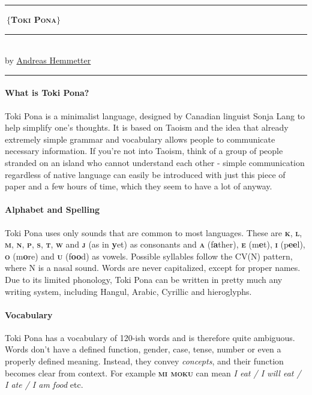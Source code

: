 \documentclass[10pt,a4paper]{article}
\author{Andreas Hemmetter}
\begin{document}
\pagestyle{empty}
\begin{center}
\rule{40mm}{2pt}$~\big\{$\textbf{\textsc{{\large  Toki Pona}}}$\big\}~$\rule{40mm}{2pt}\\
by \href{mailto:a.hemmetter@gmail.com}{Andreas Hemmetter}
\rule{15cm}{0.2pt}
\end{center}

\paragraph{What is Toki Pona?}
Toki Pona is a minimalist language, designed by Canadian linguist Sonja Lang to help simplify one's thoughts. It is based on Taoism and the idea that already extremely simple grammar and vocabulary allows people to communicate necessary information. If you're not into Taoism, think of a group of people stranded on an island who cannot understand each other - simple communication regardless of native language can easily be introduced with just this piece of paper and a few hours of time, which they seem to have a lot of anyway.

\paragraph{Alphabet and Spelling}

Toki Pona uses only sounds that are common to most languages. These are \textbf{\textsc{k}}, \textbf{\textsc{l}}, \textbf{\textsc{m}}, \textbf{\textsc{n}}, \textbf{\textsc{p}}, \textbf{\textsc{s}}, \textbf{\textsc{t}}, \textbf{\textsc{w}} and \textbf{\textsc{j}} (as in \textbf{y}et) as consonants and \textbf{\textsc{a}} (f\textbf{a}ther), \textbf{\textsc{e}} (m\textbf{e}t), \textbf{\textsc{i}} (p\textbf{ee}l), \textbf{\textsc{o}} (m\textbf{o}re) and \textbf{\textsc{u}} (f\textbf{oo}d) as vowels. Possible syllables follow the CV(N) pattern, where N is a nasal sound. Words are never capitalized, except for proper names. Due to its limited phonology, Toki Pona can be written in pretty much any writing system, including Hangul, Arabic, Cyrillic and hieroglyphs.

\paragraph{Vocabulary}

Toki Pona has a vocabulary of 120-ish words and is therefore quite ambiguous. Words don't have a defined function, gender, case, tense, number or even a properly defined meaning. Instead, they convey \textit{concepts}, and their function becomes clear from context. For example \textbf{\textsc{mi moku}} can mean \textit{I eat / I will eat / I ate / I am food} etc.
\end{document}
